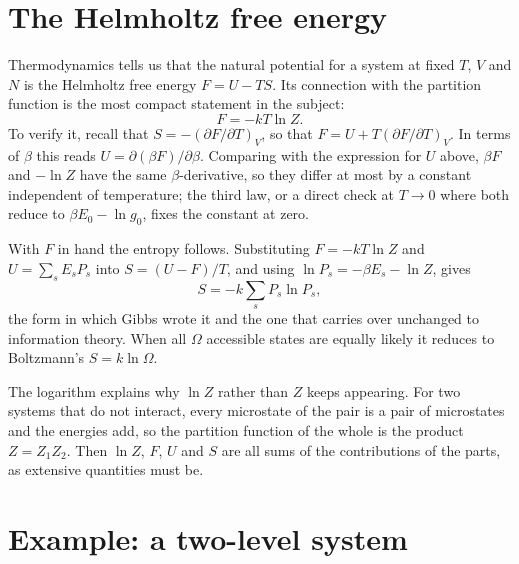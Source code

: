 \documentclass[10pt,twoside]{book}
\begin{document}
\section{The Helmholtz free energy}

Thermodynamics tells us that the natural potential for a system at fixed $T$, $V$ and $N$ is the Helmholtz free energy $F = U - TS$. Its connection with the partition function is the most compact statement in the subject:
\begin{equation}
  F = -kT \ln Z .
\end{equation}
To verify it, recall that $S = -(\partial F/\partial T)_V$, so that $F = U + T(\partial F/\partial T)_V$. In terms of $\beta$ this reads $U = \partial(\beta F)/\partial\beta$. Comparing with the expression for $U$ above, $\beta F$ and $-\ln Z$ have the same $\beta$-derivative, so they differ at most by a constant independent of temperature; the third law, or a direct check at $T\to 0$ where both reduce to $\beta E_0 - \ln g_0$, fixes the constant at zero.

With $F$ in hand the entropy follows. Substituting $F = -kT\ln Z$ and $U = \sum_s E_s P_s$ into $S = (U-F)/T$, and using $\ln P_s = -\beta E_s - \ln Z$, gives
\begin{equation}
  S = -k \sum_s P_s \ln P_s ,
\end{equation}
the form in which Gibbs wrote it and the one that carries over unchanged to information theory. When all $\Omega$ accessible states are equally likely it reduces to Boltzmann's $S = k\ln\Omega$.

The logarithm explains why $\ln Z$ rather than $Z$ keeps appearing. For two systems that do not interact, every microstate of the pair is a pair of microstates and the energies add, so the partition function of the whole is the product $Z = Z_1 Z_2$. Then $\ln Z$, $F$, $U$ and $S$ are all sums of the contributions of the parts, as extensive quantities must be.

\section{Example: a two-level system}
\end{document}
